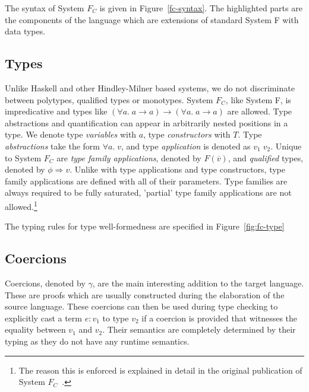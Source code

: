 The syntax of System $F_C$ is given in Figure~\ref{fc-syntax}.
The highlighted parts are the components of the language which are extensions of
standard System F with data types.

\subsection{Types}

Unlike Haskell and other Hindley-Milner\cite{hindley}\cite{damas-milner} based
systems, we do not discriminate
between polytypes, qualified types or monotypes. System $F_C$, like System F, is
impredicative and types like $(\forall a. \; a \rightarrow a) \rightarrow
(\forall a. \; a \rightarrow a)$ are allowed. Type abstractions and
quantification can appear in arbitrarily nested positions in a type. We denote type \textit{variables}
with $a$, type \textit{constructors} with $T$. Type \textit{abstractions} take the form
$\forall a. \; v$, and type \textit{application} is denoted as $v_1 \; v_2$. Unique to System $F_C$
are \textit{type family applications}, denoted by $F(\overline{v})$, and
\textit{qualified} types, denoted by $\phi \Rightarrow v$. Unlike with type
applications and type constructors, type family applications are defined with
all of their parameters. Type families are always required to be fully
saturated, 'partial' type family applications are not allowed.\footnote{The
reason this is enforced is explained in detail in the original
publication of System $F_C$~\cite{Sulzmann:2007:SFT:1190315.1190324}.}

The typing rules for type well-formedness are specified in
Figure~\ref{fig:fc-type}

\subsection{Coercions}

Coercions, denoted by $\gamma$, are the main interesting addition to the target
language. These are proofs which are usually constructed during the elaboration
of the source language. These coercions can then be used during type checking to
explicitly cast a term $e : v_1$ to type $v_2$ if a coercion is provided that
witnesses the equality between $v_1$ and $v_2$. Their semantics are completely
determined by their typing as they do not have any runtime semantics.

